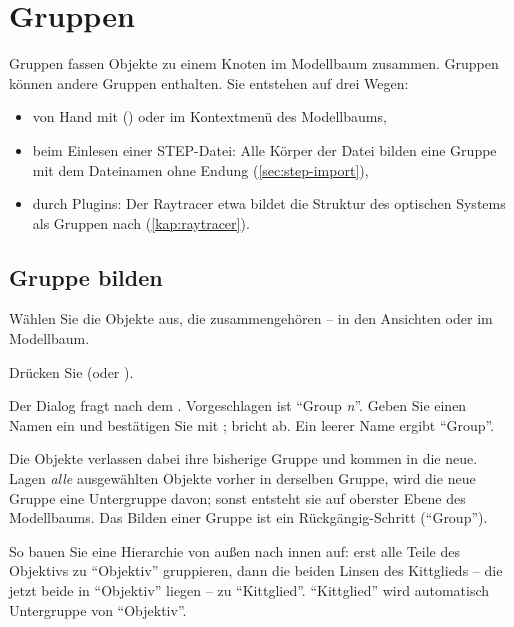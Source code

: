 \section{Gruppen}\label{sec:gruppen}

Gruppen fassen Objekte zu einem Knoten im Modellbaum zusammen. Gruppen können andere Gruppen
enthalten. Sie entstehen auf drei Wegen:

\begin{itemize}
  \item von Hand mit  () oder  im
    Kontextmenü des Modellbaums,
  \item beim Einlesen einer STEP-Datei: Alle Körper der Datei bilden eine Gruppe mit dem
    Dateinamen ohne Endung (\autoref{sec:step-import}),
  \item durch Plugins: Der Raytracer etwa bildet die Struktur des optischen Systems als
    Gruppen nach (\autoref{kap:raytracer}).
\end{itemize}

\subsection{Gruppe bilden}

\begin{schritte}
  \item Wählen Sie die Objekte aus, die zusammengehören -- in den Ansichten oder im
    Modellbaum.
  \item Drücken Sie  (oder ).
  \item Der Dialog  fragt nach dem . Vorgeschlagen ist
    \enquote{Group \textit{n}}. Geben Sie einen Namen ein und bestätigen Sie mit ;
     bricht ab. Ein leerer Name ergibt \enquote{Group}.
\end{schritte}

Die Objekte verlassen dabei ihre bisherige Gruppe und kommen in die neue. Lagen \emph{alle}
ausgewählten Objekte vorher in derselben Gruppe, wird die neue Gruppe eine Untergruppe davon;
sonst entsteht sie auf oberster Ebene des Modellbaums. Das Bilden einer Gruppe ist ein
Rückgängig-Schritt (\enquote{Group}).

\begin{tipp}
So bauen Sie eine Hierarchie von außen nach innen auf: erst alle Teile des Objektivs zu
\enquote{Objektiv} gruppieren, dann die beiden Linsen des Kittglieds -- die jetzt beide in
\enquote{Objektiv} liegen -- zu \enquote{Kittglied}. \enquote{Kittglied} wird automatisch
Untergruppe von \enquote{Objektiv}.
\end{tipp}

